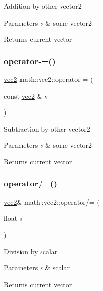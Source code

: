 Addition by other vector2 
\begin{DoxyParams}{Parameters}
{\em v} & some vector2 \\
\hline
\end{DoxyParams}
\begin{DoxyReturn}{Returns}
current vector 
\end{DoxyReturn}
\mbox{\label{structmath_1_1vec2_a9c6705809a9bfa54e6cde070f10a4984}} 
\subsubsection{\texorpdfstring{operator-\/=()}{operator-=()}}
{\footnotesize\ttfamily \hyperlink{structmath_1_1vec2}{vec2} math\+::vec2\+::operator-\/= (\begin{DoxyParamCaption}\item[{const \hyperlink{structmath_1_1vec2}{vec2} \&}]{v }\end{DoxyParamCaption})\hspace{0.3cm}{\ttfamily [inline]}}

Subtraction by other vector2 
\begin{DoxyParams}{Parameters}
{\em v} & some vector2 \\
\hline
\end{DoxyParams}
\begin{DoxyReturn}{Returns}
current vector 
\end{DoxyReturn}
\mbox{\label{structmath_1_1vec2_a5a1153001cba3493edd3a2d8d6060ae2}} 
\subsubsection{\texorpdfstring{operator/=()}{operator/=()}}
{\footnotesize\ttfamily \hyperlink{structmath_1_1vec2}{vec2}\& math\+::vec2\+::operator/= (\begin{DoxyParamCaption}\item[{float}]{s }\end{DoxyParamCaption})\hspace{0.3cm}{\ttfamily [inline]}}

Division by scalar 
\begin{DoxyParams}{Parameters}
{\em s} & scalar \\
\hline
\end{DoxyParams}
\begin{DoxyReturn}{Returns}
current vector 
\end{DoxyReturn}
\mbox{\label{structmath_1_1vec2_a1ffee39907a0aa106ac5b8a5faa3d7b0}} 
